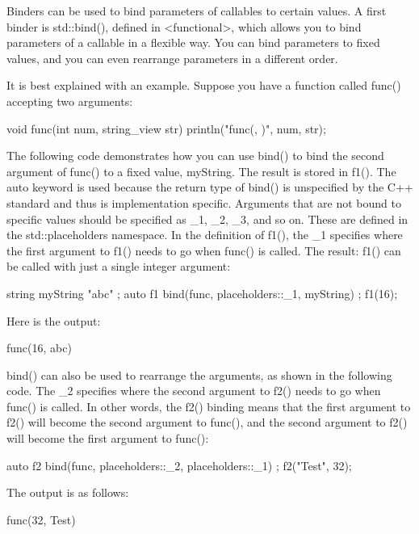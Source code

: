 
Binders can be used to bind parameters of callables to certain values. A first binder is std::bind(), defined in <functional>, which allows you to bind parameters of a callable in a flexible way. You can bind parameters to fixed values, and you can even rearrange parameters in a different order.

It is best explained with an example. Suppose you have a function called func() accepting two arguments:

\begin{cpp}
void func(int num, string_view str)
{
    println("func({}, {})", num, str);
}
\end{cpp}

The following code demonstrates how you can use bind() to bind the second argument of func() to a fixed value, myString. The result is stored in f1(). The auto keyword is used because the return type of bind() is unspecified by the C++ standard and thus is implementation specific. Arguments that are not bound to specific values should be specified as \_1, \_2, \_3, and so on. These are defined in the std::placeholders namespace. In the definition of f1(), the \_1 specifies where the first argument to f1() needs to go when func() is called. The result: f1() can be called with just a single integer argument:

\begin{cpp}
string myString { "abc" };
auto f1 { bind(func, placeholders::_1, myString) };
f1(16);
\end{cpp}

Here is the output:

\begin{shell}
func(16, abc)
\end{shell}

bind() can also be used to rearrange the arguments, as shown in the following code. The \_2 specifies where the second argument to f2() needs to go when func() is called. In other words, the f2() binding means that the first argument to f2() will become the second argument to func(), and the second argument to f2() will become the first argument to func():

\begin{cpp}
auto f2 { bind(func, placeholders::_2, placeholders::_1) };
f2("Test", 32);
\end{cpp}

The output is as follows:

\begin{shell}
func(32, Test)
\end{shell}

